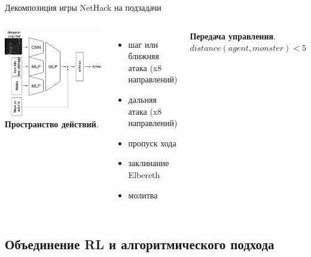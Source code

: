 \begin{frame}{Декомпозиция игры NetHack на подзадачи}
\begin{columns}
\centering
\includegraphics[width=1\linewidth]{images/raph_arch.pdf}
\textbf{Пространство действий}. 
\begin{itemize}
    \item шаг или ближняя атака (x8 направлений)
    \item дальняя атака (x8 направлений)
    \item пропуск хода
    \item заклинание Elbereth
    \item молитва
\end{itemize}
\textbf{Передача управления}. 
$distance(agent, monster) < 5$
\end{columns}
\end{frame}

\subsection{Объединение RL и алгоритмического подхода}

